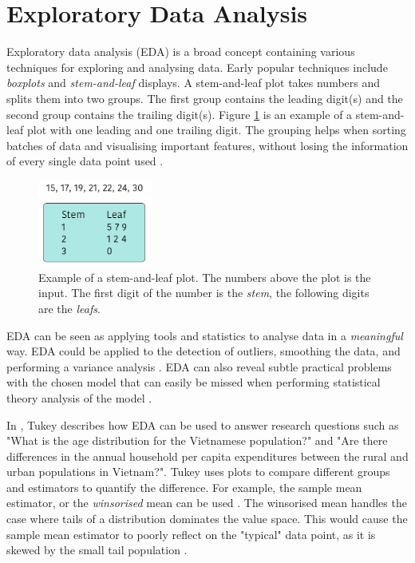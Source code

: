 \section{Exploratory Data Analysis}
Exploratory data analysis (EDA) is a broad concept containing various techniques \cite{Anselin1999, Gelman2003, Hoaglin2003, Tukey1977, Velleman1981} for exploring and analysing data.
Early popular techniques include \emph{boxplots} and \emph{stem-and-leaf} displays.
A stem-and-leaf plot takes numbers and splits them into two groups.
The first group contains the leading digit(s) and the second group contains the trailing digit(s).
Figure \ref{fig:stem-leaf-plot} is an example of a stem-and-leaf plot with one leading and one trailing digit.
The grouping helps when sorting batches of data and visualising important features, without losing the information of every single data point used \cite{Velleman1981}.

\begin{figure} [h!]
  \centering
    \includegraphics[width=0.33\textwidth]{figures/stem-leaf-plot}
  \caption{Example of a stem-and-leaf plot. The numbers above the plot is the input.
  The first digit of the number is the \emph{stem}, the following digits are the \emph{leafs}.}
  \label{fig:stem-leaf-plot}
\end{figure}

\newpage
EDA can be seen as applying tools and statistics to analyse data in a \emph{meaningful} way.
EDA could be applied to the detection of outliers, smoothing the data, and performing a variance analysis \cite{Anselin1999, Hoaglin2003, Tukey1977, Velleman1981}.
EDA can also reveal subtle practical problems with the chosen model that can easily be missed when performing statistical theory analysis of the model \cite{Gelman2003}.

In \cite{Tukey1977}, Tukey describes how EDA can be used to answer research questions such as "What is the age distribution for the Vietnamese population?" and "Are there differences in
the annual household per capita expenditures between the rural and urban populations in Vietnam?".
Tukey uses plots to compare different groups and estimators to quantify the difference.
For example, the sample mean estimator, or the \emph{winsorised} mean can be used \cite{Tukey1977}.
The winsorised mean handles the case where tails of a distribution dominates the value space.  
This would cause the sample mean estimator to poorly reflect on the "typical" data point, as it is skewed by the small tail population \cite{Tukey1977}.

